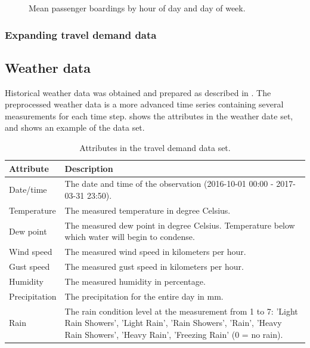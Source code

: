 \documentclass[a4paper,11pt]{article}
\begin{document}
\begin{figure}[!ht]
    \center
    
    \caption{Mean passenger boardings by hour of day and day of week.}
    \label{fig:travelcard_hist}
\end{figure}
\clearpage

\subsubsection{Expanding travel demand data}\label{ch:expand_traveldemand}

\clearpage

\subsection{Weather data}\label{ch:desc_weather}
Historical weather data was obtained and prepared as described in . The preprocessed weather data is a more advanced time series containing several measurements for each time step.  shows the attributes in the weather date set, and  shows an example of the data set.

\begin{table}[!ht]
    \center
    \begin{tabular}{p{1in}p{4in}}        
        Attribute & Description \\
        \hline 
        \hline 
        Date/time & The date and time of the observation (2016-10-01 00:00 - 2017-03-31 23:50). \\
        \hline         
        Temperature & The measured temperature in degree Celsius. \\
        \hline         
        Dew point & The measured dew point in degree Celsius. Temperature below which water will begin to condense. \\
        \hline         
        Wind speed & The measured wind speed in kilometers per hour. \\
        \hline         
        Gust speed & The measured gust speed in kilometers per hour. \\
        \hline         
        Humidity & The measured humidity in percentage. \\
        \hline         
        Precipitation & The precipitation for the entire day in mm. \\
        \hline         
        Rain & The rain condition level at the measurement from 1 to 7: 'Light Rain Showers', 'Light Rain',
  'Rain Showers', 'Rain',
  'Heavy Rain Showers', 'Heavy Rain',
  'Freezing Rain' (0 = no rain). \\
    \end{tabular}
    \caption{Attributes in the travel demand data set.}
    \label{tab:weather_data_attr}
\end{table}
\end{document}
